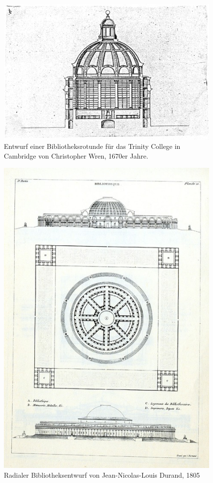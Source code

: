 \begin{figure}[htbp]
\centering
\includegraphics{img/wagner-7.jpg}
\caption{Entwurf einer Bibliotheksrotunde für das Trinity
College in Cambridge von Christopher Wren, 1670er Jahre.}
\end{figure}

\begin{figure}[htbp]
\centering
\includegraphics{img/wagner-8.jpg}
\caption{Radialer Bibliotheksentwurf von Jean-Nicolas-Louis
Durand, 1805}
\end{figure}

